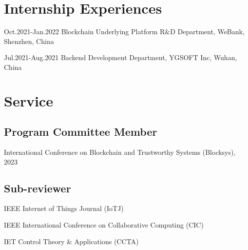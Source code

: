 \documentclass[12pt,letterpaper]{report}
\newcommand{\listitemspace}{0.25em}
\renewenvironment{itemize}
{\begin{list}{}{\setlength{\leftmargin}{0em}
                \setlength{\parskip}{0em}
                \setlength{\itemsep}{\listitemspace}
                \setlength{\parsep}{\listitemspace}}}
{\end{list}}
\begin{document}
    \section*{Internship Experiences}
    \begin{tablist}
        \item[Oct.2021-Jan.2022] \tab{}Blockchain Underlying Platform R\&D Department, WeBank, Shenzhen, China
        \item[Jul.2021-Aug.2021] \tab{}Backend Development Department, YGSOFT Inc, Wuhan, China
    \end{tablist}


    \section*{Service}
    \subsection*{Program Committee Member}
    \begin{itemize}
        \item International Conference on Blockchain and Trustworthy Systems (Blocksys), 2023
    \end{itemize}
    \subsection*{Sub-reviewer}
    \begin{itemize}
        \item IEEE Internet of Things Journal (IoTJ)
        \item IEEE International Conference on Collaborative Computing (CIC)
        \item IET Control Theory \& Applications (CCTA)
    \end{itemize}
\end{document}
